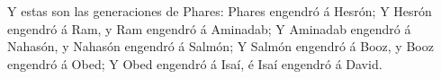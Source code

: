  Y estas son las generaciones de Phares: Phares engendró
á Hesrón;  Y Hesrón engendró á Ram, y Ram engendró á
Aminadab;  Y Aminadab engendró á Nahasón, y Nahasón
engendró á Salmón;  Y Salmón engendró á Booz, y Booz
engendró á Obed;  Y Obed engendró á Isaí, é Isaí engendró
á David.

